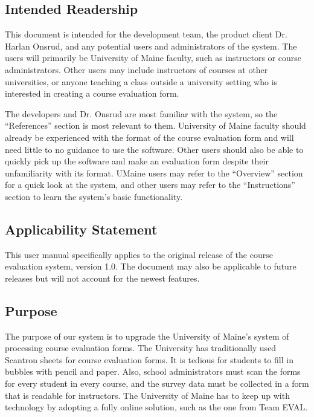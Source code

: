 \documentclass{article}
\begin{document}
\subsection{Intended Readership}

This document is intended for the development team, the product client Dr. Harlan Onsrud, and any potential users and administrators of the system. The users will primarily be University of Maine faculty, such as instructors or course administrators. Other users may include instructors of courses at other universities, or anyone teaching a class outside a university setting who is interested in creating a course evaluation form.

The developers and Dr. Onsrud are most familiar with the system, so the ``References'' section is most relevant to them. University of Maine faculty should already be experienced with the format of the course evaluation form and will need little to no guidance to use the software. Other users should also be able to quickly pick up the software and make an evaluation form despite their unfamiliarity with its format. UMaine users may refer to the ``Overview'' section for a quick look at the system, and other users may refer to the ``Instructions'' section to learn the system's basic functionality.

\subsection{Applicability Statement}

This user manual specifically applies to the original release of the course evaluation system, version 1.0. The document may also be applicable to future releases but will not account for the newest features.

\subsection{Purpose}

The purpose of our system is to upgrade the University of Maine's system of processing course evaluation forms. The University has traditionally used Scantron sheets for course evaluation forms. It is tedious for students to fill in bubbles with pencil and paper. Also, school administrators must scan the forms for every student in every course, and the survey data must be collected in a form that is readable for instructors. The University of Maine has to keep up with technology by adopting a fully online solution, such as the one from Team EVAL.
\end{document}
